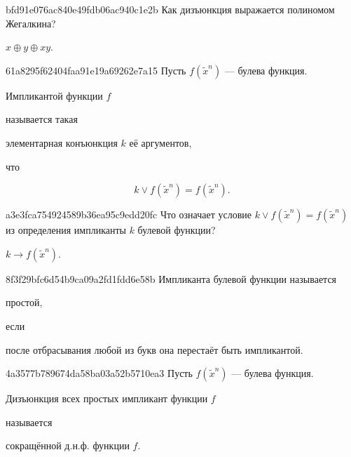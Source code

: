 \begin{note}{bfd91e076ac840e49fdb06ac940c1e2b}
    Как дизъюнкция выражается полиномом Жегалкина?

    \begin{cloze}{1}
        \({ x \oplus y \oplus xy }\).
    \end{cloze}
\end{note}

\begin{note}{61a8295f62404faa91e19a69262e7a15}
    Пусть \({ f(\widetilde x^{n}) }\) --- булева функция.
    \begin{icloze}{3}Импликантой функции \({ f }\)\end{icloze} называется такая \begin{icloze}{2}элементарная конъюнкция \({ k }\) её аргументов,\end{icloze} что
    \begin{icloze}{1}
        \[
            k \lor f(\widetilde x^{n}) = f(\widetilde x^{n}).
        \]
    \end{icloze}
\end{note}

\begin{note}{a3e3fca754924589b36ea95c9edd20fc}
    Что означает условие \({ k \lor f(\widetilde x^{n}) = f(\widetilde x^{n}) }\) из определения импликанты \({ k }\) булевой функции?

    \begin{cloze}{1}
        \({ k \to f(\widetilde x^{n}) }\).
    \end{cloze}
\end{note}

\begin{note}{8f3f29bfc6d54b9ca09a2fd1fdd6e58b}
    Импликанта булевой функции называется \begin{icloze}{2}простой,\end{icloze} если \begin{icloze}{1}после отбрасывания любой из букв она перестаёт быть импликантой.\end{icloze}
\end{note}

\begin{note}{4a3577b789674da58ba03a52b5710ea3}
    Пусть \({ f(\widetilde x^{n}) }\) --- булева функция.
    \begin{icloze}{2}Дизъюнкция всех простых импликант функции \({ f }\)\end{icloze} называется \begin{icloze}{1}сокращённой д.н.ф. функции \({ f }\).\end{icloze}
\end{note}

